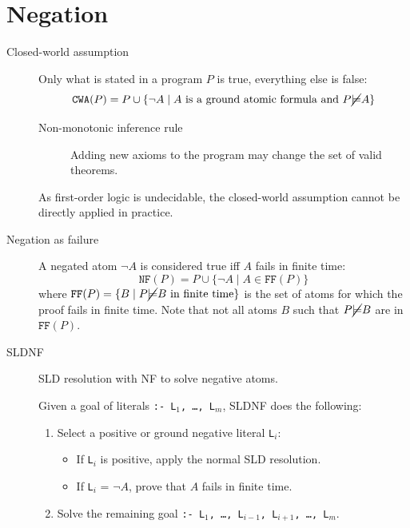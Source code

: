 \section{Negation}

\begin{description}
    \item[Closed-world assumption] 
        Only what is stated in a program $P$ is true, everything else is false:
        \[ \texttt{CWA}(P) = P \cup \{ \lnot A \mid A \text{ is a ground atomic formula and } P \cancel{\models} A \} \]

        \begin{description}
            \item[Non-monotonic inference rule]
                Adding new axioms to the program may change the set of valid theorems. 
        \end{description}

        As first-order logic is undecidable, the closed-world assumption cannot be directly applied in practice.

    \item[Negation as failure] 
        A negated atom $\lnot A$ is considered true iff $A$ fails in finite time:
        \[ \texttt{NF}(P) = P \cup \{ \lnot A \mid A \in \texttt{FF}(P) \} \]
        where $\texttt{FF}(P) = \{ B \mid P \cancel{\models} B \text{ in finite time} \}$ 
        is the set of atoms for which the proof fails in finite time.
        Note that not all atoms $B$ such that $P \cancel{\models} B$ are in $\texttt{FF}(P)$.

    \item[SLDNF] 
        SLD resolution with NF to solve negative atoms.
        
        Given a goal of literals \texttt{:- L$_1$, \dots, L$_m$}, SLDNF does the following:
        \begin{enumerate}
            \item Select a positive or ground negative literal \texttt{L$_i$}:
                \begin{itemize}
                    \item If \texttt{L$_i$} is positive, apply the normal SLD resolution.
                    \item If \texttt{L$_i$} = $\lnot A$, prove that $A$ fails in finite time. 
                \end{itemize}
            \item Solve the remaining goal \texttt{:- L$_1$, \dots, L$_{i-1}$, L$_{i+1}$, \dots,  L$_m$}.
        \end{enumerate}


\end{description}
